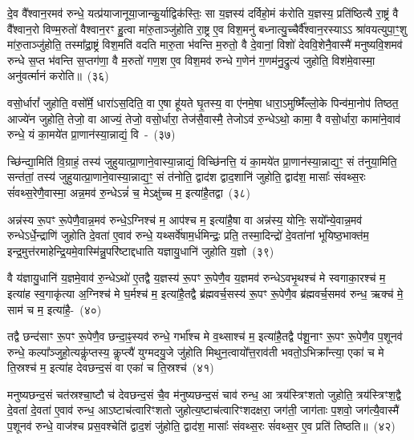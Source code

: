 दे॒व वै᳚श्वान॒रमव॑ रुन्धे॒ यत्प्र॑याजानूया॒जान्कु॒र्याद्विक॑स्तिः॒ सा य॒ज्ञस्य॑ दर्विहो॒मं क॑रोति य॒ज्ञस्य॒ प्रति॑ष्ठित्यै रा॒ष्ट्रं वै वै᳚श्वान॒रो विण्म॒रुतो॑ वैश्वान॒रꣳ हु॒त्वा मा॑रु॒ताञ्जु॑होति रा॒ष्ट्र ए॒व विश॒मनु॑ बध्नात्यु॒च्चैर्वै᳚श्वान॒रस्याऽऽ श्रा॑वयत्युपा॒ꣳ॒शु मा॑रु॒ताञ्जु॑होति॒ तस्मा᳚द्\-रा॒ष्ट्रं विश॒मति॑ वदति मारु॒ता भ॑वन्ति म॒रुतो॒ वै दे॒वानां॒ विशो॑ देववि॒शेनै॒वास्मै॑ मनुष्यवि॒शमव॑ रुन्धे स॒प्त भ॑वन्ति स॒प्तग॑णा॒ वै म॒रुतो॑ गण॒श ए॒व विश॒मव॑ रुन्धे ग॒णेन॑ ग॒णम॑नु॒द्रुत्य॑ जुहोति॒ विश॑मे॒वास्मा॒ अनु॑वर्त्मानं करोति॥~(३६)\ip

{\anuvakamend[{अग्ने॒ प्रेह्यव॑ स्म दुहे॒ तां प्र॒जा\-प॑तेः सा॒क्षान्म॑नुष्यवि॒शमेक॑विꣳशतिश्च}]}

वसो॒र्धारां᳚ जुहोति॒ वसो᳚र्मे॒ धारा॑\-ऽस॒दिति॒ वा ए॒षा हू॑यते घृ॒तस्य॒ वा ए॑नमे॒षा धारा॒\-ऽमुष्मिँ॑ल्लो॒के पिन्व॑मा॒नोप॑ तिष्ठत॒ आज्ये॑न जुहोति॒ तेजो॒ वा आज्यं॒ तेजो॒ वसो॒र्धारा॒ तेज॑सै॒वास्मै॒ तेजो\-ऽव॑ रु॒न्धे\-ऽथो॒ कामा॒ वै वसो॒र्धारा॒ कामा॑ने॒वाव॑ रुन्धे॒ यं का॒मये॑त प्रा॒णान॑स्या॒न्नाद्यं॒ वि~-~(३७)\ip

च्छि॑न्द्या॒मिति॑ वि॒ग्राहं॒ तस्य॑ जुहुयात्प्रा॒णाने॒वास्या॒न्नाद्यं॒ विच्छि॑नत्ति॒ यं का॒मये॑त प्रा॒णान॑स्या॒न्नाद्य॒ꣳ॒ सं त॑नुया॒मिति॒ सन्त॑तां॒ तस्य॑ जुहुयात्प्रा॒णाने॒वास्या॒न्नाद्य॒ꣳ॒ सं त॑नोति॒ द्वाद॑श द्वाद॒शानि॑ जुहोति॒ द्वाद॑श॒ मासाः᳚ संवथ्स॒रः सं॑वथ्स॒रेणै॒वास्मा॒ अन्न॒मव॑ रु॒न्धे\-ऽन्नं॑ च॒ मे\-ऽक्षु॑च्च म॒ इत्या॑है॒तद्वा~(३८)\ip

अन्न॑स्य रू॒पꣳ रू॒पेणै॒वान्न॒मव॑ रुन्धे॒\-ऽग्निश्च॑ म॒ आप॑श्च म॒ इत्या॑है॒षा वा अन्न॑स्य॒ योनिः॒ सयो᳚न्ये॒वान्न॒मव॑ रुन्धे\-ऽर्धे॒न्द्राणि॑ जुहोति दे॒वता॑ ए॒वाव॑ रुन्धे॒ यथ्सर्वे॑षाम॒र्धमिन्द्रः॒ प्रति॒ तस्मा॒दिन्द्रो॑ दे॒वता॑नां भूयिष्ठ॒भाक्त॑म॒ इन्द्र॒मुत्त॑रमाहेन्द्रि॒यमे॒वास्मि॑न्नु॒परि॑ष्टाद्दधाति यज्ञायु॒धानि॑ जुहोति य॒ज्ञो~(३९)\ip

वै य॑ज्ञायु॒धानि॑ य॒ज्ञमे॒वाव॑ रु॒न्धे\-ऽथो॑ ए॒तद्वै य॒ज्ञस्य॑ रू॒पꣳ रू॒पेणै॒व य॒ज्ञमव॑ रुन्धे\-ऽवभृ॒थश्च॑ मे स्वगाका॒रश्च॑ म॒ इत्या॑ह स्व॒गाकृ॑त्या अ॒ग्निश्च॑ मे घ॒र्मश्च॑ म॒ इत्या॑है॒तद्वै ब्र॑ह्मवर्च॒सस्य॑ रू॒पꣳ रू॒पेणै॒व ब्र॑ह्मवर्च॒समव॑ रुन्ध॒ ऋक्च॑ मे॒ साम॑ च म॒ इत्या॑है॒-~(४०)\ip

तद्वै छन्द॑साꣳ रू॒पꣳ रू॒पेणै॒व छन्दा॒ꣴ॒स्यव॑ रुन्धे॒ गर्भा᳚श्च मे व॒थ्साश्च॑ म॒ इत्या॑है॒तद्वै प॑शू॒नाꣳ रू॒पꣳ रू॒पेणै॒व प॒शूनव॑ रुन्धे॒ कल्पा᳚ञ्जुहो॒त्यकॢ॑प्तस्य॒ कॢप्त्यै॑ युग्मदयु॒जे जु॑होति मिथुन॒त्वायो᳚त्त॒राव॑ती भवतो॒\-ऽभिक्रा᳚न्त्या॒ एका॑ च मे ति॒स्रश्च॑ म॒ इत्या॑ह देवछन्द॒सं वा एका॑ च ति॒स्रश्च॑~(४१)\ip

मनुष्यछन्द॒सं चत॑स्रश्चा॒ष्टौ च॑ देवछन्द॒सं चै॒व म॑नुष्यछन्द॒सं चाव॑ रुन्ध॒ आ त्रय॑स्त्रिꣳशतो जुहोति॒ त्रय॑स्त्रिꣳश॒द्वै दे॒वता॑ दे॒वता॑ ए॒वाव॑ रुन्ध॒ आऽष्टाच॑त्वारिꣳशतो जुहोत्य॒ष्टाच॑त्वारिꣳशद\-क्षरा॒ जग॑ती॒ जाग॑ताः प॒शवो॒ जग॑त्यै॒वास्मै॑ प॒शूनव॑ रुन्धे॒ वाज॑श्च प्रस॒वश्चेति॑ द्वाद॒शं जु॑होति॒ द्वाद॑श॒ मासाः᳚ संवथ्स॒रः सं॑वथ्स॒र ए॒व प्रति॑ तिष्ठति॥~(४२)\ip


